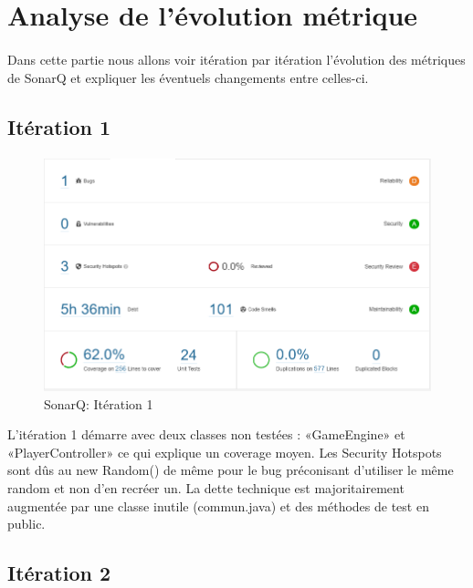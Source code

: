 \documentclass[13pt ,a4paper ]{report}
\begin{document}
\section*{Analyse de l'évolution métrique}  
\begin{multicols}{2} 

\paragraph{}
Dans cette partie nous allons voir itération par itération l’évolution des métriques de SonarQ et expliquer les éventuels changements entre celles-ci.
	\subsection{Itération 1}
	\paragraph{}
		\begin{figure}[H]
      	\begin{center}
			\includegraphics[scale=0.3]{1.png}
			\caption{SonarQ: Itération 1}
		\end{center}
		\end{figure}
	
L’itération 1 démarre avec deux classes non testées : «GameEngine» et «PlayerController» ce qui explique un coverage moyen. 
Les Security Hotspots sont dûs au new Random() de même pour le bug préconisant d’utiliser le même random et non d’en recréer un.
La dette technique est majoritairement augmentée par une classe inutile (commun.java) et des méthodes de test en public.  

	\subsection{Itération 2}

\end{multicols}
\end{document}
